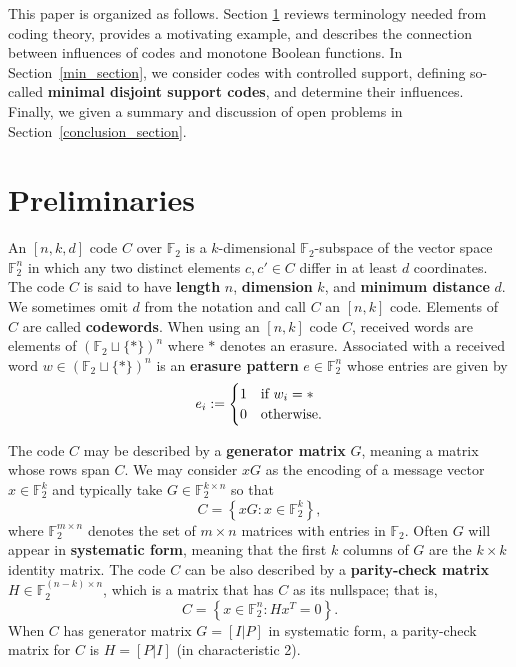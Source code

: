 \documentclass[12pt]{article}
\newcommand{\F}{\mathbb{F}}
\def\F{\mathbb F}
\theoremstyle{definition}
\begin{document}
This paper is organized as follows. Section 
\ref{prelim_section} reviews terminology needed from coding theory, provides a motivating example, and describes the connection between influences of codes and monotone Boolean functions.  In Section~\ref{min_section}, we consider codes with controlled support, defining so-called {\bf minimal disjoint support codes}, and determine their influences. Finally, we given a summary and discussion of open problems in Section~\ref{conclusion_section}.


\section{Preliminaries} \label{prelim_section}

An $[n,k,d]$ code $C$ over  $\F_2$ is a $k$-dimensional $\F_2$-subspace of the vector space $\F_2^n$ in which any two distinct elements $c, c' \in C$ differ in at least $d$ coordinates. The code $C$ is said to have {\bf length} $n$, {\bf dimension} $k$, and {\bf minimum distance} $d$. We sometimes omit \(d\) from the notation and call \(C\) an \([n,k]\) code. Elements of $C$ are called {\bf codewords}. When using an \([n,k]\) code $C$, received words are elements of $\left(\F_2 \sqcup \{ * \} \right)^n$ where $*$ denotes an erasure. 
Associated with a received word $w \in \left(\F_2 \sqcup \{ * \} \right)^n$ is an {\bf erasure pattern} $e \in \F_2^n$ whose entries are given by
$$e_i:= \begin{cases} 1 & \textnormal{if } w_i=* \\ 0 & \textnormal{otherwise}. \end{cases}$$


The code $C$ may be described by a {\bf generator matrix} $G$, meaning a matrix whose rows span $C$.  We may consider $xG$ as the encoding of a message vector $x \in \F_2^k$ and typically take $G \in \F_2^{k \times n}$ so that
$$C = \left\{ x G \colon x \in \F_2^k \right\},$$
where $\F_2^{m \times n}$ denotes the set of $m \times n$ matrices with entries in $\F_2$. Often \(G\) will appear in {\bf systematic form}, meaning that the first \(k\) columns of \(G\) are the \(k \times k\) identity matrix. The code $C$ can be also described by a {\bf parity-check matrix} $H \in \F_2^{(n-k) \times n}$, which is a matrix that has $C$ as its nullspace; that is, 
$$
C=\left\{ x  \in \F_2^n \colon Hx^T = 0 \right\}.
$$
When \(C\) has generator matrix \(G = [I | P]\) in systematic form, a parity-check matrix for \(C\) is \(H = [P | I]\) (in characteristic 2).
\end{document}
